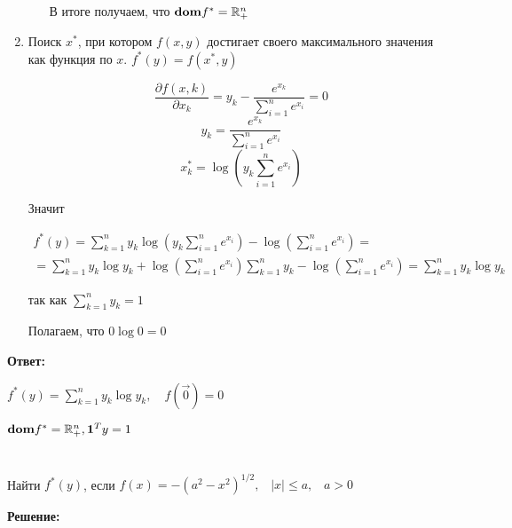 \documentclass[a4paper,12pt]{article}
\newcommand{\lt}{\left}
\newcommand{\rt}{\right}
\newcommand{\p}{\partial}
\newcommand{\fr}{\frac}
\newcommand{\bb}{\mathbb}
\begin{document}
\begin{enumerate}
\begin{itemize}
\begin{itemize}
		\end{itemize}
	
	В итоге получаем, что ${\bf dom}f^* = \bb R^n_+$
	\end{itemize}
	\item Поиск $x^*$, при котором $f(x,y)$ достигает своего максимального значения как функция по $x$. $f^*(y) = f(x^*, y)$
	
	$$\fr{\p f(x,k)}{\p x_k} = y_k - \fr{e^{x_k}}{\sum\limits_{i=1}^n e^{x_i}} = 0$$
	$$y_k = \fr{e^{x_k}}{\sum\limits_{i=1}^n e^{x_i}}$$
	$$x_k^* = \log\lt(y_k\sum\limits_{i=1}^n e^{x_i}\rt)$$
	
	Значит
	
	\begin{multline}
	f^*(y) = \sum\limits_{k=1}^n y_k \log\lt(y_k\sum\limits_{i=1}^n e^{x_i}\rt) - \log \lt( \sum\limits_{i=1}^n e^{x_i} \rt) =\\= \sum\limits_{k=1}^n y_k\log y_k +\log \lt(\sum\limits_{i=1}^n e^{x_i} \rt) \sum\limits_{k=1}^n y_k -  \log \lt( \sum\limits_{i=1}^n e^{x_i} \rt) = \sum\limits_{k=1}^n y_k\log y_k
	\end{multline}
	
	так как $\sum\limits_{k=1}^n y_k = 1$

	Полагаем, что $0\log0 = 0$
\end{enumerate}
\textbf{Ответ:}

$f^*(y) = \sum\limits_{k=1}^n y_k\log y_k, \quad f(\vec{0}) = 0$

${\bf dom}f^* = \bb R^n_+, {\bf 1}^Ty = 1 $

\section{}
Найти $f^*(y)$, если $f(x) = - (a^2 - x^2)^{1/2}, \;\;\; |x| \le a, \;\;\; a>0$

\vspace{\baselineskip}

\textbf{Решение:}
\end{document}
